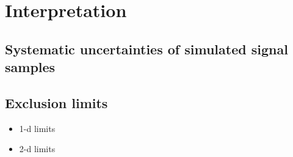 \section{Interpretation}
\label{sec:Interpretation}
\subsection{Systematic uncertainties of simulated signal samples}
\subsection{Exclusion limits}
\begin{itemize}
\item 1-d limits
\item 2-d limits
\end{itemize}

